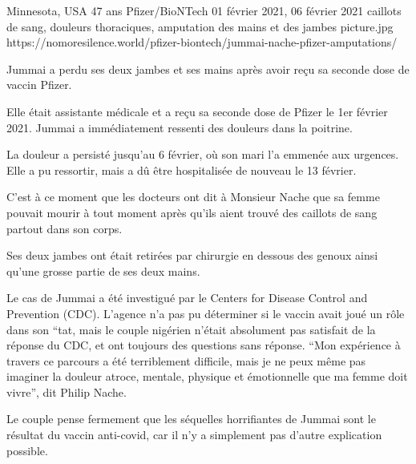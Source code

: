           {Minnesota, USA}
          {47 ans}
          {Pfizer/BioNTech}
          {01 février 2021, 06 février 2021}
          {caillots de sang, douleurs thoraciques, amputation des mains et des jambes}
          {picture.jpg}
          {https://nomoresilence.world/pfizer-biontech/jummai-nache-pfizer-amputations/}
          {

Jummai a perdu ses deux jambes et ses mains après avoir reçu sa seconde dose de
vaccin Pfizer.

Elle était assistante médicale et a reçu sa seconde dose de Pfizer le 1er
février 2021. Jummai a immédiatement ressenti des douleurs dans la poitrine.

La douleur a persisté jusqu'au 6 février, où son mari l'a emmenée aux
urgences. Elle a pu ressortir, mais a dû être hospitalisée de nouveau le 13
février.

C'est à ce moment que les docteurs ont dit à Monsieur Nache que sa femme pouvait
mourir à tout moment après qu'ils aient trouvé des caillots de sang partout dans
son corps.

Ses deux jambes ont était retirées par chirurgie en dessous des genoux ainsi
qu'une grosse partie de ses deux mains.

Le cas de Jummai a été investigué par le Centers for Disease Control and
Prevention (CDC). L'agence n'a pas pu déterminer si le vaccin avait joué un rôle
dans son “tat, mais le couple nigérien n'était absolument pas satisfait de la
réponse du CDC, et ont toujours des questions sans réponse. “Mon expérience à
travers ce parcours a été terriblement difficile, mais je ne peux même pas
imaginer la douleur atroce, mentale, physique et émotionnelle que ma femme doit
vivre”, dit Philip Nache.

Le couple pense fermement que les séquelles horrifiantes de Jummai sont le
résultat du vaccin anti-covid, car il n'y a simplement pas d'autre explication
possible.

}
